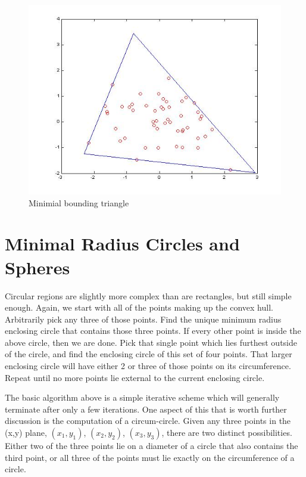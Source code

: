 \documentclass[a4paper,11pt]{article}
\begin{document}
\begin{figure}
\centering
    \includegraphics[width=5in]{tri.jpg}
        \caption{Minimial bounding triangle}
\end{figure}

\section{Minimal Radius Circles and Spheres}

Circular regions are slightly more complex than are rectangles, but still simple enough.
Again, we start with all of the points making up the convex hull. Arbitrarily pick any three
of those points. Find the unique minimum radius enclosing circle that contains those three
points. If every other point is inside the above circle, then we are done. Pick that single
point which lies furthest outside of the circle, and find the enclosing circle of this set of
four points. That larger enclosing circle will have either 2 or three of those points on its
circumference. Repeat until no more points lie external to the current enclosing circle.

The basic algorithm above is a simple iterative scheme which will generally terminate
after only a few iterations. One aspect of this that is worth further discussion is the
computation of a circum-circle. Given any three points in the (x,y) plane, $(x_1,y_1)$,
$(x_2,y_2)$, $(x_3,y_3)$, there are two distinct possibilities. Either two of the three
points lie on a diameter
of a circle that also contains the third point, or all three of the points must lie exactly on the
circumference of a circle.
\end{document}
